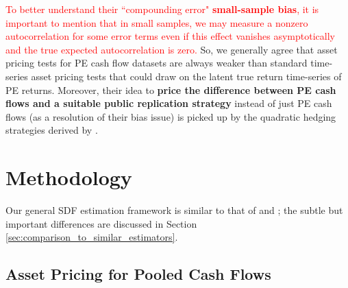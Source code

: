 \documentclass[12pt]{article}
\begin{document}
\textcolor{red}{
	To better understand their ``compounding error" \textbf{small-sample bias}, it is important to mention that in small samples, we may measure a nonzero autocorrelation for some error terms even if this effect vanishes asymptotically and the true expected autocorrelation is zero.
	}
So, we generally agree that asset pricing tests for PE cash flow datasets are always weaker than standard time-series asset pricing tests that could draw on the latent true return time-series of PE returns.
Moreover, their idea to \textbf{price the difference between PE cash flows and a suitable public replication strategy} instead of just PE cash flows (as a resolution of their bias issue) is picked up by the quadratic hedging strategies derived by \cite{T19}.


\section{Methodology}
\label{sec:spatial_sdf_methodology}

Our general SDF estimation framework is similar to that of \cite{DLP12} and \cite{KN16}; 
the subtle but important differences are discussed in Section \ref{sec:comparison_to_similar_estimators}.


\subsection{Asset Pricing for Pooled Cash Flows}
\label{sec:asset_pricing_pooled}
\end{document}
